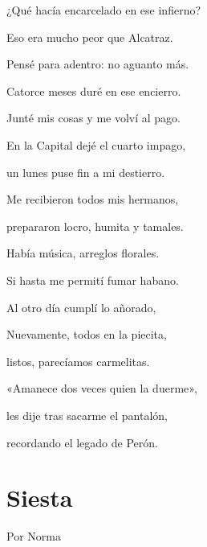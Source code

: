 \documentclass[11pt,twoside,openright,a5paper]{book}
\begin{document}
\begin{center}
¿Qué hacía encarcelado en ese infierno?

Eso era mucho peor que Alcatraz.

Pensé para adentro: no aguanto más.

\vspace{0.5cm}

Catorce meses duré en ese encierro.

Junté mis cosas y me volví al pago.

En la Capital dejé el cuarto impago,

un lunes puse fin a mi destierro.

\vspace{0.5cm}

Me recibieron todos mis hermanos,

prepararon locro, humita y tamales.

Había música, arreglos florales.

Si hasta me permití fumar habano.

\vspace{0.5cm}

Al otro día cumplí lo añorado,

Nuevamente, todos en la piecita,

listos, parecíamos carmelitas.

\vspace{0.5cm}

«Amanece dos veces quien la duerme»,

les dije tras sacarme el pantalón,

recordando el legado de Perón.
\end{center}

\section*{Siesta}
                                                                                                                   \begin{flushright}Por Norma\end{flushright}
\end{document}
